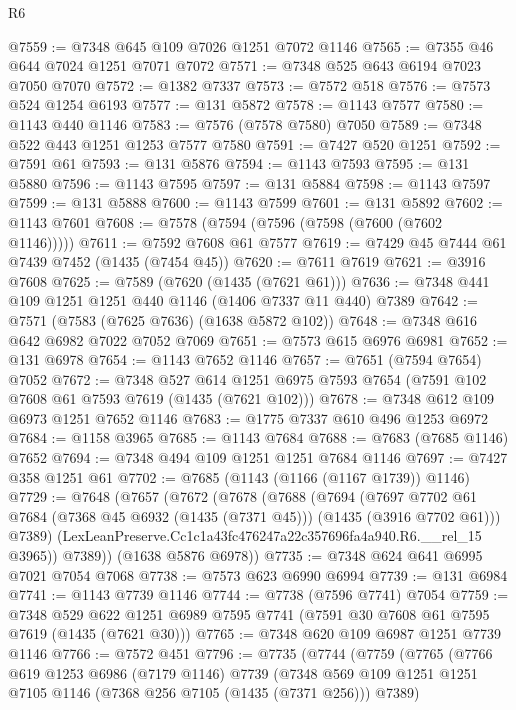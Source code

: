 \begin{lexlean}{R6}
\begin{coremodule}
@7559 := @7348 @645 @109 @7026 @1251 @7072 @1146
@7565 := @7355 @46 @644 @7024 @1251 @7071 @7072
@7571 := @7348 @525 @643 @6194 @7023 @7050 @7070
@7572 := @1382 @7337
@7573 := @7572 @518
@7576 := @7573 @524 @1254 @6193
@7577 := @131 @5872
@7578 := @1143 @7577
@7580 := @1143 @440 @1146
@7583 := @7576 (@7578 @7580) @7050
@7589 := @7348 @522 @443 @1251 @1253 @7577 @7580
@7591 := @7427 @520 @1251
@7592 := @7591 @61
@7593 := @131 @5876
@7594 := @1143 @7593
@7595 := @131 @5880
@7596 := @1143 @7595
@7597 := @131 @5884
@7598 := @1143 @7597
@7599 := @131 @5888
@7600 := @1143 @7599
@7601 := @131 @5892
@7602 := @1143 @7601
@7608 := @7578 (@7594 (@7596 (@7598 (@7600 (@7602 @1146)))))
@7611 := @7592 @7608 @61 @7577
@7619 := @7429 @45 @7444 @61 @7439 @7452 (@1435 (@7454 @45))
@7620 := @7611 @7619
@7621 := @3916 @7608
@7625 := @7589 (@7620 (@1435 (@7621 @61)))
@7636 := @7348 @441 @109 @1251 @1251 @440 @1146 (@1406 @7337 @11 @440) @7389
@7642 := @7571 (@7583 (@7625 @7636) (@1638 @5872 @102))
@7648 := @7348 @616 @642 @6982 @7022 @7052 @7069
@7651 := @7573 @615 @6976 @6981
@7652 := @131 @6978
@7654 := @1143 @7652 @1146
@7657 := @7651 (@7594 @7654) @7052
@7672 := @7348
    @527
    @614
    @1251
    @6975
    @7593
    @7654
    (@7591 @102 @7608 @61 @7593 @7619 (@1435 (@7621 @102)))
@7678 := @7348 @612 @109 @6973 @1251 @7652 @1146
@7683 := @1775 @7337 @610 @496 @1253 @6972
@7684 := @1158 @3965
@7685 := @1143 @7684
@7688 := @7683 (@7685 @1146) @7652
@7694 := @7348 @494 @109 @1251 @1251 @7684 @1146
@7697 := @7427 @358 @1251 @61
@7702 := @7685 (@1143 (@1166 (@1167 @1739)) @1146)
@7729 := @7648
    (@7657
      (@7672
        (@7678
          (@7688
            (@7694
              (@7697
                @7702
                @61
                @7684
                (@7368 @45 @6932 (@1435 (@7371 @45)))
                (@1435 (@3916 @7702 @61)))
              @7389)
            (LexLeanPreserve.Cc1c1a43fc476247a22c357696fa4a940.R6.__rel_15 @3965))
          @7389))
      (@1638 @5876 @6978))
@7735 := @7348 @624 @641 @6995 @7021 @7054 @7068
@7738 := @7573 @623 @6990 @6994
@7739 := @131 @6984
@7741 := @1143 @7739 @1146
@7744 := @7738 (@7596 @7741) @7054
@7759 := @7348
    @529
    @622
    @1251
    @6989
    @7595
    @7741
    (@7591 @30 @7608 @61 @7595 @7619 (@1435 (@7621 @30)))
@7765 := @7348 @620 @109 @6987 @1251 @7739 @1146
@7766 := @7572 @451
@7796 := @7735
    (@7744
      (@7759
        (@7765
          (@7766
            @619
            @1253
            @6986
            (@7179 @1146)
            @7739
            (@7348 @569 @109 @1251 @1251 @7105 @1146 (@7368 @256 @7105 (@1435 (@7371 @256))) @7389)

\end{coremodule}
\end{lexlean}
